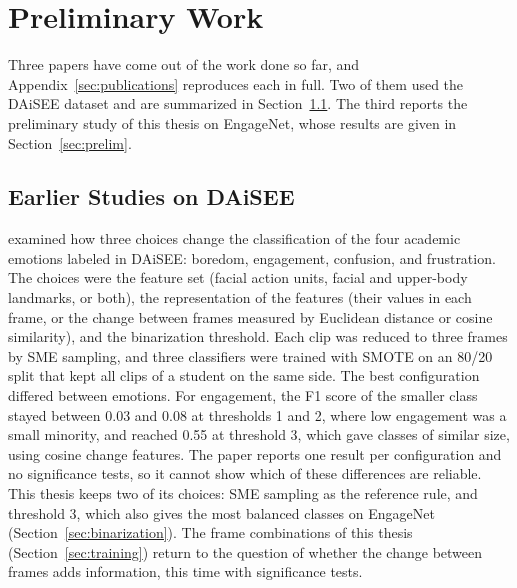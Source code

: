 
\section{Preliminary Work}
\label{sec:prelimwork}

Three papers have come out of the work done so far, and Appendix~\ref{sec:publications} reproduces each in full. Two of them used the DAiSEE dataset \cite{gupta2016} and are summarized in Section~\ref{sec:daisee}. The third reports the preliminary study of this thesis on EngageNet, whose results are given in Section~\ref{sec:prelim}.

\subsection{Earlier Studies on DAiSEE}
\label{sec:daisee}

 examined how three choices change the classification of the four academic emotions labeled in DAiSEE: boredom, engagement, confusion, and frustration. The choices were the feature set (facial action units, facial and upper-body landmarks, or both), the representation of the features (their values in each frame, or the change between frames measured by Euclidean distance or cosine similarity), and the binarization threshold. Each clip was reduced to three frames by SME sampling, and three classifiers were trained with SMOTE on an 80/20 split that kept all clips of a student on the same side. The best configuration differed between emotions. For engagement, the F1 score of the smaller class stayed between 0.03 and 0.08 at thresholds 1 and 2, where low engagement was a small minority, and reached 0.55 at threshold 3, which gave classes of similar size, using cosine change features. The paper reports one result per configuration and no significance tests, so it cannot show which of these differences are reliable. This thesis keeps two of its choices: SME sampling as the reference rule, and threshold 3, which also gives the most balanced classes on EngageNet (Section~\ref{sec:binarization}). The frame combinations of this thesis (Section~\ref{sec:training}) return to the question of whether the change between frames adds information, this time with significance tests.

